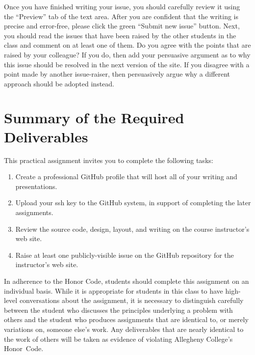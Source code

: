 Once you have finished writing your issue, you should carefully review it using the ``Preview'' tab of the text area.
After you are confident that the writing is precise and error-free, please click the green ``Submit new issue'' button.
Next, you should read the issues that have been raised by the other students in the class and comment on at least one of
them. Do you agree with the points that are raised by your colleague? If you do, then add your persuasive argument as to
why this issue should be resolved in the next version of the site. If you disagree with a point made by another
issue-raiser, then persuasively argue why a different approach should be adopted instead.

\vspace*{-.05in}
\section*{Summary of the Required Deliverables}

This practical assignment invites you to complete the following tasks:

\vspace*{-.1in}
\begin{enumerate}
  \setlength{\itemsep}{0in}

  \item Create a professional GitHub profile that will host all of your writing and presentations.
  \item Upload your ssh key to the GitHub system, in support of completing the later assignments.
  \item Review the source code, design, layout, and writing on the course instructor's web site.
  \item Raise at least one publicly-visible issue on the GitHub repository for the instructor's web site.

\end{enumerate}
\vspace*{-.1in}

In adherence to the Honor Code, students should complete this assignment on an individual basis. While it is appropriate
for students in this class to have high-level conversations about the assignment, it is necessary to distinguish
carefully between the student who discusses the principles underlying a problem with others and the student who produces
assignments that are identical to, or merely variations on, someone else's work. Any deliverables that are nearly
identical to the work of others will be taken as evidence of violating Allegheny College's \mbox{Honor Code}.



